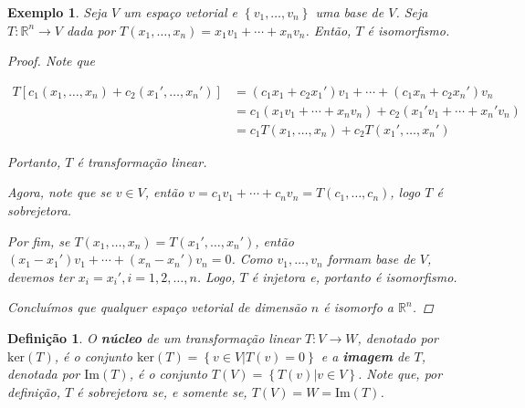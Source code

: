 \documentclass{article}
\newtheorem*{definition}{Definição}
\newtheorem*{example}{Exemplo}
\begin{document}
\begin{example}
	Seja $V$ um espaço vetorial e $\left\{v_1, \dots, v_n\right\}$ uma base de $V$. Seja $T:\mathbb{R}^n\to V$ dada por $T(x_1, \dots, x_n) = x_1v_1 + \cdots + x_nv_n$. Então, $T$ é isomorfismo.
	
	\begin{proof}
		Note que 
		
		\begin{align*}
		T[  c_1(x_1, \dots, x_n) + c_2(x_1', \dots, x_n')        ] &= (c_1x_1 + c_2x_1')v_1 + \cdots + (c_1x_n + c_2x_n')v_n \\
		&= c_1(x_1v_1 + \cdots + x_nv_n) + c_2(x_1'v_1 + \cdots + x_n'v_n) \\
		&= c_1T(x_1, \dots, x_n) + c_2T(x_1', \dots, x_n')
		\end{align*}
		
		\par\vspace{0.3cm} Portanto, $T$ é transformação linear.
		
		\par\vspace{0.3cm} Agora, note que se $v\in V$, então $v = c_1v_1 + \cdots + c_nv_n = T(c_1, \dots, c_n)$, logo $T$ é sobrejetora.
		
		\par\vspace{0.3cm} Por fim, se $T(x_1, \dots, x_n) = T(x_1', \dots, x_n')$, então $(x_1 - x_1')v_1 + \cdots + (x_n - x_n')v_n = 0$. Como $v_1, \dots, v_n$ formam base de $V$, devemos ter $x_i = x_i', i=1,2, \dots, n$. Logo, $T$ é injetora e, portanto é isomorfismo.
		
		\par\vspace{0.3cm} Concluímos que qualquer espaço vetorial de dimensão $n$ é isomorfo a $\mathbb{R}^n$. 
		
	\end{proof}
	
	
\end{example}

\begin{definition}
	O \textbf{núcleo} de um transformação linear $T:V\to W$, denotado por $\text{ker}(T)$, é o conjunto $\text{ker}(T) = \left\{ v\in V|T(v) = 0 \right\}$ e a \textbf{imagem} de $T$, denotada por $\text{Im}(T)$, é o conjunto $T(V) = \left\{ T(v)|v\in V \right\}$. Note que, por definição, $T$ é sobrejetora se, e somente se, $T(V) = W = \text{Im}(T)$.
\end{definition}
\end{document}
